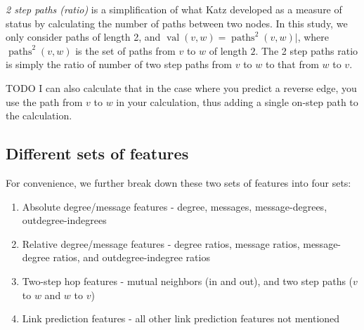 \documentclass[conference]{IEEEtran}
\begin{document}
\emph{2 step paths (ratio)} is a simplification of what Katz \cite{Katz:1953un} developed as a measure of status by calculating the number of paths between two nodes. In this study, we only consider paths of length 2, and $\operatorname{val}(v,w) = \operatorname{paths}^2(v,w)|$, where $\operatorname{paths}^2(v,w)$ is the set of paths from $v$ to $w$ of length $2$. The 2 step paths ratio is simply the ratio of number of two step paths from $v$ to $w$ to that from $w$ to $v$. 

TODO I can also calculate that in the case where you predict a reverse edge, you use the path from $v$ to $w$ in your calculation, thus adding a single on-step path to the calculation.

\subsection{Different sets of features}
For convenience, we further break down these two sets of features into four sets:
\begin{enumerate}
	\item Absolute degree/message features - degree, messages, message-degrees, outdegree-indegrees
	\item Relative degree/message features - degree ratios, message ratios, message-degree ratios, and outdegree-indegree ratios
	\item Two-step hop features - mutual neighbors (in and out), and two step paths ($v$ to $w$ and $w$ to $v$)
	\item Link prediction features - all other link prediction features not mentioned
\end{enumerate}
\end{document}

